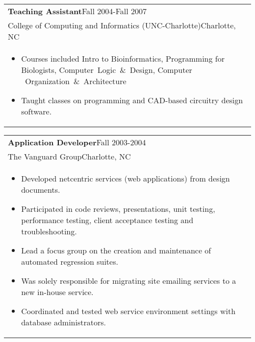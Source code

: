 \documentclass[12pt]{report}
\def\fullLength{6.5in}
\begin{document}
\vspace{-10.0mm}

\begin{table}[!ht]
\begin{tabular}{p{\fullLength}}
\textbf{Teaching Assistant}\hfill Fall 2004-Fall 2007\\
College of Computing and Informatics (UNC-Charlotte)\hfill Charlotte, NC\\
\vspace{-7.0mm}
\begin{itemize}\addtolength{\itemsep}{-0.5\baselineskip}
\item Courses included Intro to Bioinformatics, Programming for Biologists, Computer~Logic~\&~Design, Computer	~Organization~\&~Architecture
\item Taught classes on programming and CAD-based circuitry design software.
\end{itemize}
\end{tabular}
\end{table}

\clearpage

\begin{table}[!ht]
\begin{tabular}{p{\fullLength}}
\textbf{Application Developer}\hfill Fall 2003-2004\\
The Vanguard Group\hfill Charlotte, NC\\
\vspace{-7.0mm}
\begin{itemize}\addtolength{\itemsep}{-0.5\baselineskip}
\item Developed netcentric services (web applications) from design documents.
\item Participated in code reviews, presentations, unit testing, performance testing, client acceptance testing and troubleshooting.
\item Lead a focus group on the creation and maintenance of automated regression suites.
\item Was solely responsible for migrating site emailing services to a new in-house service.
\item Coordinated and tested web service environment settings with database administrators.
\end{itemize}
\end{tabular}
\end{table}
\end{document}
